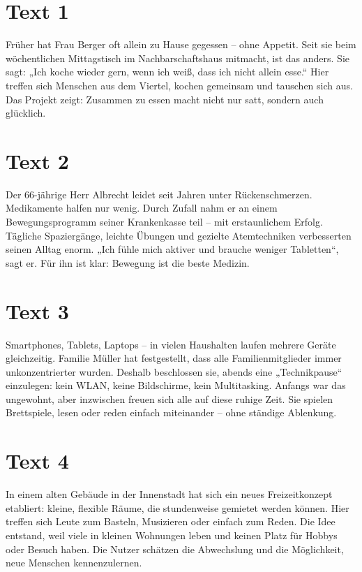 \documentclass[a4paper]{article}
\title{}
\date{}
\author{Mohammad Rahmani}
\begin{document}
   \maketitle

   \section{Text 1}

      Früher hat Frau Berger oft allein zu Hause gegessen – ohne Appetit. Seit sie beim wöchentlichen Mittagstisch im Nachbarschaftshaus mitmacht, ist das anders. Sie sagt: „Ich koche wieder gern, wenn ich weiß, dass ich nicht allein esse.“ Hier treffen sich Menschen aus dem Viertel, kochen gemeinsam und tauschen sich aus. Das Projekt zeigt: Zusammen zu essen macht nicht nur satt, sondern auch glücklich.

   \section{Text 2}

      Der 66-jährige Herr Albrecht leidet seit Jahren unter Rückenschmerzen. Medikamente halfen nur wenig. Durch Zufall nahm er an einem Bewegungsprogramm seiner Krankenkasse teil – mit erstaunlichem Erfolg. Tägliche Spaziergänge, leichte Übungen und gezielte Atemtechniken verbesserten seinen Alltag enorm. „Ich fühle mich aktiver und brauche weniger Tabletten“, sagt er. Für ihn ist klar: Bewegung ist die beste Medizin.

   \section{Text 3}

      Smartphones, Tablets, Laptops – in vielen Haushalten laufen mehrere Geräte gleichzeitig. Familie Müller hat festgestellt, dass alle Familienmitglieder immer unkonzentrierter wurden. Deshalb beschlossen sie, abends eine „Technikpause“ einzulegen: kein WLAN, keine Bildschirme, kein Multitasking. Anfangs war das ungewohnt, aber inzwischen freuen sich alle auf diese ruhige Zeit. Sie spielen Brettspiele, lesen oder reden einfach miteinander – ohne ständige Ablenkung.

   \section{Text 4}

      In einem alten Gebäude in der Innenstadt hat sich ein neues Freizeitkonzept etabliert: kleine, flexible Räume, die stundenweise gemietet werden können. Hier treffen sich Leute zum Basteln, Musizieren oder einfach zum Reden. Die Idee entstand, weil viele in kleinen Wohnungen leben und keinen Platz für Hobbys oder Besuch haben. Die Nutzer schätzen die Abwechslung und die Möglichkeit, neue Menschen kennenzulernen.
\end{document}

